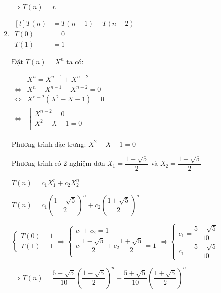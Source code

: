 \documentclass[12pt, letterpaper]{article}
\begin{document}
\begin{enumerate}
	      $ \Rightarrow T(n) = n $
	\item $ \begin{aligned}[t]
			      T(n) & = T(n - 1) + T(n - 2) \\
			      T(0) & = 0                   \\
			      T(1) & = 1
		      \end{aligned} $

	      Đặt $ T(n) = X^n $ ta có:

	      $ \begin{aligned}
			                      & X^n = X^{n - 1} + X^{n - 2}     \\
			      \Leftrightarrow & X^n - X^{n - 1} - X^{n - 2} = 0 \\
			      \Leftrightarrow & X^{n - 2}(X^2 - X - 1) = 0      \\
			      \Leftrightarrow & \left[
			      \begin{array}{ll}
				      X^{n - 2} = 0   \\
				      X^2 - X - 1 = 0 \\
			      \end{array}
			      \right .
		      \end{aligned} $

	      Phương trình đặc trưng: $ X^2 - X - 1  = 0 $

	      Phương trình có 2 nghiệm đơn $ X_1 = \dfrac{1 - \sqrt{5}}{2} $ và $ X_2 = \dfrac{1 + \sqrt{5}}{2}  $

	      $ T(n) = c_1X_1^n + c_2X_2^n $

	      $ T(n) = c_1 {\left(\dfrac{1 - \sqrt{5}}{2}\right)}^n + c_2 {\left(\dfrac{1 + \sqrt{5}}{2}\right)}^n $

	      $ \begin{cases}
			      T(0) = 1 \\
			      T(1) = 1
		      \end{cases}
		      \Rightarrow{}
		      \begin{cases}
			      c_1 + c_2 = 1                                                 \\
			      c_1 \dfrac{1 - \sqrt{5}}{2} + c_2 \dfrac{1 + \sqrt{5}}{2} = 1 \\
		      \end{cases}
		      \Rightarrow{}
		      \begin{cases}
			      c_1 = \dfrac{5 - \sqrt{5}}{10} \\
			      c_1 = \dfrac{5 + \sqrt{5}}{10}
		      \end{cases} $

	      $ \Rightarrow T(n) = \dfrac{5 - \sqrt{5}}{10} {\left(\dfrac{1 - \sqrt{5}}{2}\right)}^n + \dfrac{5 + \sqrt{5}}{10} {\left(\dfrac{1 + \sqrt{5}}{2}\right)}^n  $

\end{enumerate}
\end{document}

